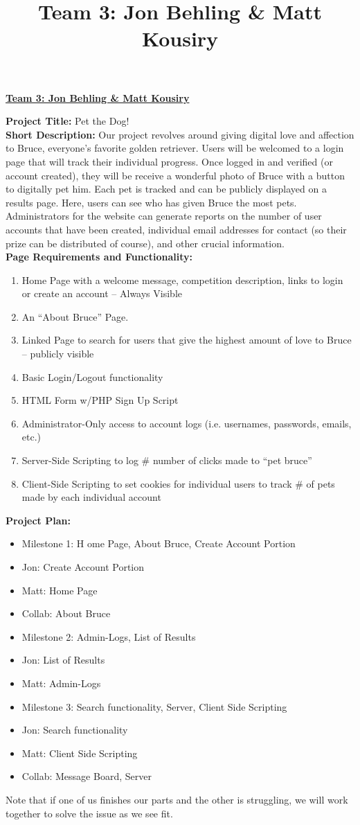 \documentclass[12pt, letterpaper]{article}
\title{Team 3: Jon Behling & Matt Kousiry}
\begin{document}
\begin{center}
\textbf{\underline{Team 3: Jon Behling \& Matt Kousiry}}
\end{center}
\textbf{Project Title: }Pet the Dog!
\\
\textbf{Short Description: }Our project revolves around giving digital love and affection to Bruce, everyone’s favorite golden retriever. Users will be welcomed to a login page that will track their individual progress. Once logged in and verified (or account created), they will be receive a wonderful photo of Bruce with a button to digitally pet him. Each pet is tracked and can be publicly displayed on a results page. Here, users can see who has given Bruce the most pets. Administrators for the website can generate reports on the number of user accounts that have been created, individual email addresses for contact (so their prize can be distributed of course), and other crucial information. 
\\
\textbf{Page Requirements and Functionality: }
\begin{enumerate}
    \item Home Page with a welcome message, competition description, links to login or create an account – Always Visible
    \item An “About Bruce” Page.
    \item Linked Page to search for users that give the highest amount of love to Bruce – publicly visible
    \item Basic Login/Logout functionality
    \item HTML Form w/PHP Sign Up Script
    \item Administrator-Only access to account logs (i.e. usernames, passwords, emails, etc.)
    \item Server-Side Scripting to log \# number of clicks made to “pet bruce”
    \item Client-Side Scripting to set cookies for individual users to track \# of pets made by each individual account
\end{enumerate}
\textbf{Project Plan:}
\begin{itemize}[label={-}]
    \item Milestone 1: H	ome Page, About Bruce, Create Account Portion
    \item Jon:  Create Account Portion
    \item Matt:  Home Page
    \item Collab: About Bruce
    \item Milestone 2: Admin-Logs, List of Results
    \item Jon: List of Results
    \item Matt: Admin-Logs
    \item Milestone 3: Search functionality, Server, Client Side Scripting
    \item Jon:  Search functionality
    \item Matt: Client Side Scripting
    \item Collab: Message Board, Server
\end{itemize}

Note that if one of us finishes our parts and the other is struggling, we will work together to solve the issue as we see fit.
\end{document}
